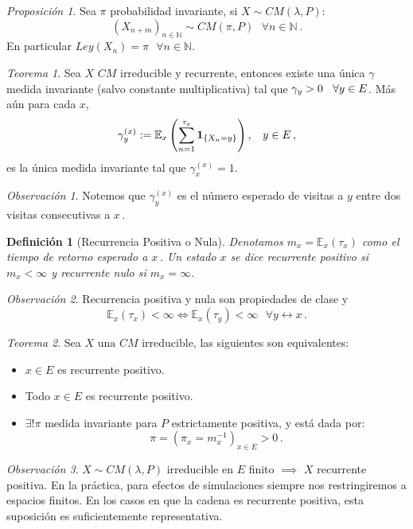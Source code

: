 \documentclass[letterpaper,11pt]{article} %
\def\espacio{\hspace{.25cm}\,}
\theoremstyle{defbreak}
\newtheorem{definition}{Definición}[subsection]
\theoremstyle{propbreak}
\theoremstyle{remark}
\newtheorem{remark}{Observación}[subsection]
\theoremstyle{break}
\newtheorem{theorem}{Teorema}[subsection]
\newtheorem{proposition}{Proposición}[subsection]
\def\ssi{\Longleftrightarrow}
\def\E{\mathbb{E}}
\def\N{\mathbb{N}}
\def\cm{CM(\lambda,P)}
\begin{document}
\begin{proposition}
Sea $\pi$ probabilidad invariante, si $X\sim\cm$:
$$ (X_{n+m})_{n\in \N}\sim CM(\pi,P) \mbox{ }\forall n\in \N \, .$$
En particular $Ley(X_n)=\pi \mbox{ }\forall n \in\N$.
\end{proposition}
\begin{theorem}
Sea $X$ $CM$ irreducible y recurrente, entonces existe una única $\gamma$ medida invariante  (salvo constante multiplicativa) tal que $\gamma_y>0\espacio \forall y \in E$.
\newline Más aún para cada $x$, 
$$\gamma_y^{(x)}:=\E_x\left(\displaystyle\sum^{\tau_x}_{n=1}\mathbf{1}_{\{X_n=y\}}\right),\espacio y\in E \, ,$$
es la única medida invariante tal que $\gamma_x^{(x)}=1$.
\end{theorem}
\begin{remark}
Notemos que $\gamma_y^{(x)}$ es el número esperado de visitas a $y$ entre dos visitas consecutivas a $x$\,.
\end{remark}
\begin{definition}[Recurrencia Positiva o Nula]
Denotamos $m_x=\E_x(\tau_x)$ como el tiempo de retorno esperado a $x$\,.
\newline Un estado $x$ se dice recurrente positivo si $m_x<\infty$ y recurrente nulo si $m_x=\infty$.
\end{definition}
\begin{remark}
Recurrencia positiva y nula son propiedades de clase y 
$$\E_x(\tau_x)<\infty\ssi\E_x(\tau_y)<\infty \mbox{ }\forall y\longleftrightarrow x \, .$$
\end{remark}
\begin{theorem}
Sea $X \mbox{ una } CM$ irreducible, las siguientes son equivalentes:
\begin{itemize}
    \item $x\in E$ es recurrente positivo.
    \item Todo $x\in E$ es recurrente positivo.
    \item $\exists ! \pi$ medida invariante para $P$ estrictamente positiva, y está dada por:
    $$ \pi = (\pi_x=m_x^{-1})_{x\in E}>0 \, .$$
\end{itemize}
\end{theorem}
\begin{remark}
$X\sim\cm$ irreducible en $E$ finito $\implies$ $X$ recurrente positiva.
\newline En la práctica, para efectos de simulaciones siempre nos restringiremos a espacios finitos.  En los casos en que la cadena es recurrente positiva, esta suposición es suficientemente representativa.
\end{remark}
\end{document}
